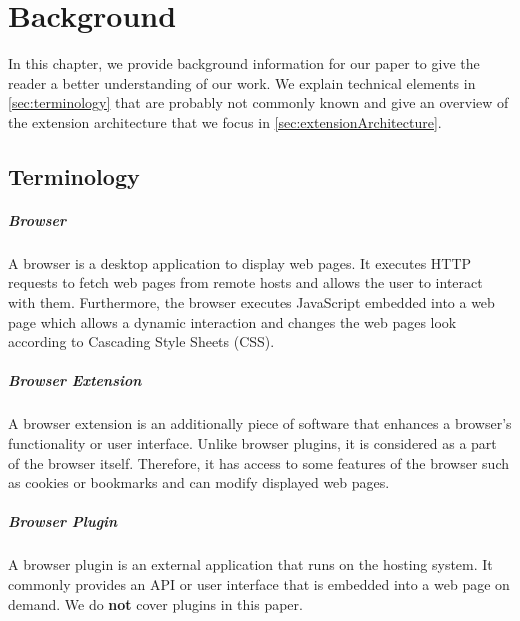 
\chapter{Background}
\label{chp:background}

	In this chapter, we provide background information for our paper to give the reader a better understanding of our work. We explain technical elements in \autoref{sec:terminology} that are probably not commonly known and give an overview of the extension architecture that we focus in \autoref{sec:extensionArchitecture}.

\section{Terminology}
\label{sec:terminology}

\paragraph{Browser}

	A browser is a desktop application to display web pages. It executes HTTP requests to fetch web pages from remote hosts and allows the user to interact with them. Furthermore, the browser executes JavaScript embedded into a web page which allows a dynamic interaction and changes the web pages look according to Cascading Style Sheets (CSS).
	
\paragraph{Browser Extension}
	
	A browser extension is an additionally piece of software that enhances a browser's functionality or user interface. Unlike browser plugins, it is considered as a part of the browser itself. Therefore, it has access to some features of the browser such as cookies or bookmarks and can modify displayed web pages. 
	
\paragraph{Browser Plugin}

	A browser plugin is an external application that runs on the hosting system. It commonly provides an API or user interface that is embedded into a web page on demand. We do \textbf{not} cover plugins in this paper.

